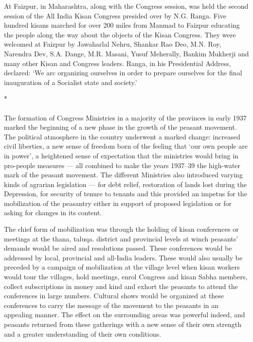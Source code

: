 \begin{multicols}{2}
At Faizpur, in Maharashtra, along with the Congress session, was held the second session of the All India Kisan Congress presided over by N.G. Ranga. Five hundred kisans marched for over 200 miles from Manmad to Faizpur educating the people along the way about the objects of the Kisan Congress. They were welcomed at Faizpur by Jawaharlal Nehru, Shankar Rao Deo, M.N. Roy, Narendra Dev, S.A. Dange, M.R. Masani, Yusuf Meherally, Bankim Mukherji and many other Kisan and Congress leaders. Ranga, in his Presidential Address, declared: `We arc organizing ourselves in order to prepare ourselves for the final inauguration of a Socialist state and society.'

\begin{center}*\end{center}

\paragraph*{}

The formation of Congress Ministries in a majority of the provinces in early 1937 marked the beginning of a new phase in the growth of the peasant movement. The political atmosphere in the country underwent a marked change: increased civil liberties, a new sense of freedom born of the feeling that `our own people are in power', a heightened sense of expectation that the ministries would bring in pro-people measures --- all combined to make the years 1937--39 the high-water mark of the peasant movement. The different Ministries also introduced varying kinds of agrarian legislation --- for debt relief, restoration of lands lost during the Depression, for security of tenure to tenants and this provided an impetus for the mobilization of the peasantry either in support of proposed legislation or for asking for changes in its content.

The chief form of mobilization was through the holding of kisan conferences or meetings at the thana, taluqa. district and provincial levels at winch peasants' demands would be aired and resolutions passed. These conferences would be addressed by local, provincial and all-India leaders. These would also usually be preceded by a campaign of mobilization at the village level when kisan workers would tour the villages, hold meetings, enrol Congress and kisan Sabha members, collect subscriptions in money and kind and exhort the peasants to attend the conferences in large numbers. Cultural shows would be organized at these conferences to carry the message of the movement to the peasants in an appealing manner. The effect on the surrounding areas was powerful indeed, and peasants returned from these gatherings with a new sense of their own strength and a greater understanding of their own conditions.


\end{multicols}
